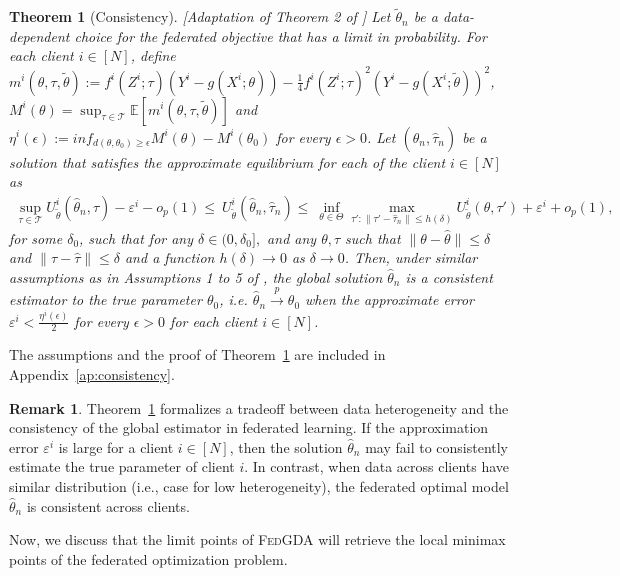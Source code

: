 \documentclass{article}
\let\cite\relax
\newcommand*{\cite}{\citep}
\def\gT{{\mathcal{T}}}
\newcommand{\fgda}{\textsc{FedGDA}\xspace}
\newtheorem{theorem}{Theorem}%
\theoremstyle{definition}
\newtheorem{remark}{Remark}%
\begin{document}
\begin{theorem}[Consistency][Adaptation of Theorem 2 of \cite{bennett2019deep}]
\label{thm:consistency}
    Let $\tilde\theta_{n}$ be a data-dependent choice for the federated objective that has a limit in probability. For each client $i\in[N]$, define $        m^i(\theta,\tau,\tilde{\theta}):=f^i(Z^i;\tau)(Y^i-g(X^i;\theta))-\frac{1}{4}f^i(Z^i;\tau)^2(Y^i-g(X^i;\tilde{\theta}))^2$, $ M^i(\theta)=\sup_{\tau \in \gT}\mathbb{E}[m^i(\theta,\tau,\tilde{\theta})]$ and  $\eta^i(\epsilon):=inf_{d(\theta,\theta_0)\ge\epsilon}M^i(\theta)-M^i(\theta_0)$ for every $\epsilon>0$. Let $(\hat\theta_{n},\hat\tau_{n})$ be a solution that satisfies the approximate equilibrium for each of the client $i\in[N]$ as
\begin{eqnarray*}
      \sup_{\tau\in\gT}  U_{\tilde\theta}^i(\hat\theta_{n},\tau)-\varepsilon^i - o_p(1)\leq  ~U^i_{\tilde\theta}(\hat\theta_{n},\hat\tau_{n})\leq ~\inf_{\theta\in\Theta} {\max_{{\tau\prime : \|\tau\prime-\hat\tau_{n}\|\leq h(\delta)}} U^i_{\tilde\theta}(\theta,\tau\prime)}+\varepsilon^i+o_p(1),
\end{eqnarray*}
     for some $\delta_0$, such that for any $\delta\in(0,\delta_0],$ and any $\theta,\tau$ such that $\|\theta-\hat\theta\|\leq \delta$ and $\|\tau-\hat\tau\|\leq\delta$  and a function $h(\delta)\rightarrow0$ as $\delta\rightarrow0$. Then, under similar assumptions as in Assumptions 1 to 5 of \cite{bennett2019deep}, the global solution $\hat\theta_{n}$ is a consistent estimator to the true parameter $\theta_0$, i.e. $\hat\theta_{n}\xrightarrow{p}\theta_0$ when the approximate error $\varepsilon^i<\frac{\eta^i(\epsilon)}{2}$ for every $\epsilon>0$ for each client $i\in[N]$.
        \end{theorem} 
        
The assumptions and the proof of Theorem~\ref{thm:consistency} are included in Appendix~\ref{ap:consistency}.
        
\begin{remark}
Theorem~\ref{thm:consistency} formalizes a tradeoff between data heterogeneity and the consistency of the global estimator in federated learning. If the approximation error $\varepsilon^i$ is large for a client $i\in[N]$, then the solution $\hat\theta_n$ may fail to consistently estimate the true parameter of client $i$. In contrast, when data across clients have similar distribution (i.e., case for low heterogeneity), the federated optimal model $\hat\theta_n$ is consistent across clients.

\end{remark}
 Now, we discuss that the limit points of \fgda will retrieve the local minimax points of the federated optimization problem. 
\end{document}
